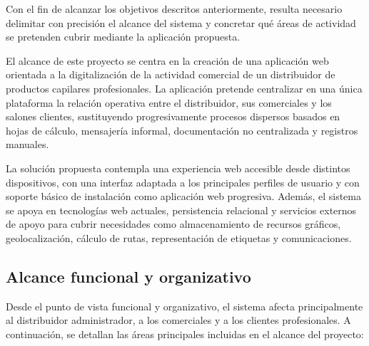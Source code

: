 Con el fin de alcanzar los objetivos descritos anteriormente, resulta necesario delimitar con precisión el alcance del sistema y concretar qué áreas de actividad se pretenden cubrir mediante la aplicación propuesta.

El alcance de este proyecto se centra en la creación de una aplicación web orientada a la digitalización de la actividad comercial de un distribuidor de productos capilares profesionales. La aplicación pretende centralizar en una única plataforma la relación operativa entre el distribuidor, sus comerciales y los salones clientes, sustituyendo progresivamente procesos dispersos basados en hojas de cálculo, mensajería informal, documentación no centralizada y registros manuales.

La solución propuesta contempla una experiencia web accesible desde distintos dispositivos, con una interfaz adaptada a los principales perfiles de usuario y con soporte básico de instalación como aplicación web progresiva. Además, el sistema se apoya en tecnologías web actuales, persistencia relacional y servicios externos de apoyo para cubrir necesidades como almacenamiento de recursos gráficos, geolocalización, cálculo de rutas, representación de etiquetas y comunicaciones.

\subsection{Alcance funcional y organizativo}
Desde el punto de vista funcional y organizativo, el sistema afecta principalmente al distribuidor administrador, a los comerciales y a los clientes profesionales. A continuación, se detallan las áreas principales incluidas en el alcance del proyecto:

